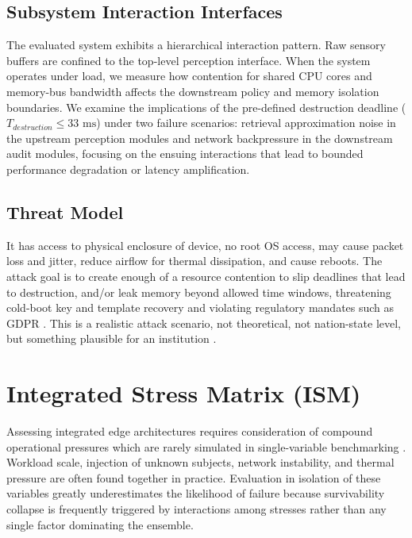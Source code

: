 \documentclass[conference]{IEEEtran}
\begin{document}
\subsection{Subsystem Interaction Interfaces}
The evaluated system exhibits a hierarchical interaction pattern. Raw sensory buffers are confined to the top-level perception interface. When the system operates under load, we measure how contention for shared CPU cores and memory-bus bandwidth affects the downstream policy and memory isolation boundaries. We examine the implications of the pre-defined destruction deadline ($T_{destruction} \le 33\text{ ms}$) under two failure scenarios: retrieval approximation noise in the upstream perception modules and network backpressure in the downstream audit modules, focusing on the ensuing interactions that lead to bounded performance degradation or latency amplification.

\subsection{Threat Model}
It has access to physical enclosure of device, no root OS access, may cause packet loss and jitter, reduce airflow for thermal dissipation, and cause reboots. The attack goal is to create enough of a resource contention to slip deadlines that lead to destruction, and/or leak memory beyond allowed time windows, threatening cold-boot key and template recovery \cite{b11} and violating regulatory mandates such as GDPR \cite{b15}. This is a realistic attack scenario, not theoretical, not nation-state level, but something plausible for an institution \cite{b32}.

\section{Integrated Stress Matrix (ISM)}

Assessing integrated edge architectures requires consideration of compound operational pressures which are rarely simulated in single-variable benchmarking \cite{b24, b26, b31}. Workload scale, injection of unknown subjects, network instability, and thermal pressure are often found together in practice. Evaluation in isolation of these variables greatly underestimates the likelihood of failure because survivability collapse is frequently triggered by interactions among stresses rather than any single factor dominating the ensemble.
\end{document}
